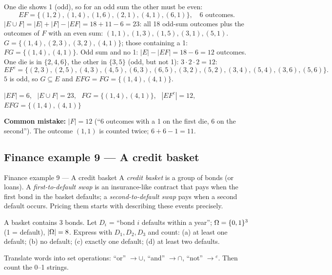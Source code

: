 	 One die shows 1 (odd), so for an odd sum the other must be even:
	\[ EF=\{(1,2),(1,4),(1,6),(2,1),(4,1),(6,1)\},\quad 6\text{ outcomes}. \]
	 $|E\cup F|=|E|+|F|-|EF|=18+11-6=23$: all 18 odd-sum
	outcomes plus the outcomes of $F$ with an even sum: $(1,1),(1,3),(1,5),
		(3,1),(5,1)$.
	 $G=\{(1,4),(2,3),(3,2),(4,1)\}$; those containing a 1:
	$FG=\{(1,4),(4,1)\}$.
	 Odd sum and no 1: $|E|-|EF|=18-6=12$ outcomes. One die
	is in $\{2,4,6\}$, the other in $\{3,5\}$ (odd, but not 1): $3\cdot2\cdot2=12$:
	\[ EF^c=\{(2,3),(2,5),(4,3),(4,5),(6,3),(6,5),(3,2),(5,2),(3,4),(5,4),
		(3,6),(5,6)\}. \]
	 $5$ is odd, so $G\subseteq E$ and $EFG=FG=\{(1,4),(4,1)\}$.
	\begin{answer}
		$|EF|=6$, \ $|E\cup F|=23$, \ $FG=\{(1,4),(4,1)\}$, \ $|EF^c|=12$, \
		$EFG=\{(1,4),(4,1)\}$
	\end{answer}
	\begin{remark}
		\textbf{Common mistake:} $|F|=12$ (``6 outcomes with a 1 on the first die,
		6 on the second''). The outcome $(1,1)$ is counted twice; $6+6-1=11$.
	\end{remark}
\fi

\subsection{Finance example 9 --- A credit basket}

\begin{fin}{Finance example 9 --- A credit basket}
	\context A \emph{credit basket} is a group of bonds (or loans). A
	\emph{first-to-default swap} is an insurance-like contract that pays when
	the first bond in the basket defaults; a \emph{second-to-default swap} pays
	when a second default occurs. Pricing them starts with describing these
	events precisely.

	A basket contains 3 bonds. Let $D_i$ = ``bond $i$ defaults within a
	year''; $\Omega=\{0,1\}^3$ (1 = default), $|\Omega|=8$. Express with
	$D_1,D_2,D_3$ and count: (a) at least one default; (b) no default;
	(c) exactly one default; (d) at least two defaults.
\end{fin}
\workspace{3.5cm}

\ifsolutions
	\soltitle
	\idea Translate words into set operations: ``or'' $\to\cup$, ``and''
	$\to\cap$, ``not'' $\to{}^c$. Then count the 0--1 strings.


